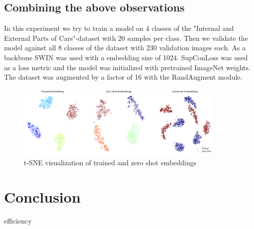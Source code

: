 \documentclass[12pt,a4paper]{report}
\begin{document}
\newpage

\section{Combining the above observations}

In this experiment we try to train a model on 4 classes of the "Internal and External Parts of Cars"-dataset with 20 samples per class.
Then we validate the model against all 8 classes of the dataset with 230 validation images each.
As a backbone SWIN was used with a embedding size of 1024.
SupConLoss was used as a loss metric and the model was initialized with pretrained ImageNet weights.
The dataset was augmented by a factor of 16 with the RandAugment module.


\begin{figure}[hb]
	\centering
	\includegraphics[width=0.9\textwidth]{../plots/final.png}
	\caption{t-SNE visualization of trained and zero shot embeddings}
\end{figure}


\chapter{Conclusion}

efficiency 


\end{document}
